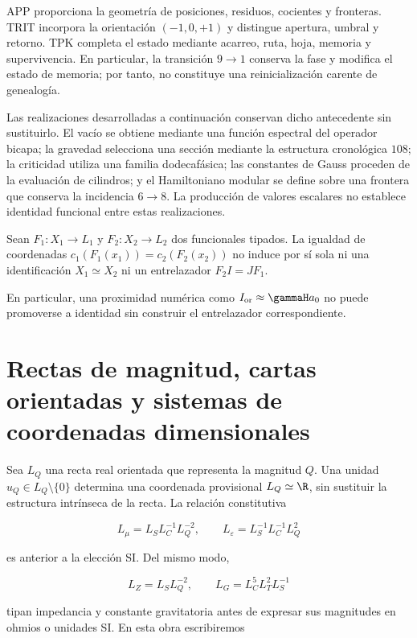 APP proporciona la geometr\'ia de posiciones, residuos, cocientes y
fronteras. TRIT incorpora la orientaci\'on \((-1,0,+1)\) y distingue
apertura, umbral y retorno. TPK completa el estado mediante acarreo, ruta,
hoja, memoria y supervivencia. En particular, la transici\'on \(9\to1\)
conserva la fase y modifica el estado de memoria; por tanto, no constituye
una reinicializaci\'on carente de genealog\'ia.

Las realizaciones desarrolladas a continuaci\'on conservan dicho antecedente sin sustituirlo. El vac\'io se obtiene mediante una funci\'on espectral del operador bicapa; la gravedad selecciona una secci\'on mediante la estructura cronol\'ogica \(108\); la criticidad utiliza una familia dodecaf\'asica; las constantes de Gauss proceden de la evaluaci\'on de cilindros; y el Hamiltoniano modular se define sobre una frontera que conserva la incidencia \(6\to8\). La producci\'on de valores escalares no establece identidad funcional entre estas realizaciones.

\begin{proposition}
Sean \(F_1:X_1\to L_1\) y \(F_2:X_2\to L_2\) dos funcionales tipados. La
igualdad de coordenadas \(c_1(F_1(x_1))=c_2(F_2(x_2))\) no induce por
s\'i sola ni una identificaci\'on \(X_1\simeq X_2\) ni un entrelazador
\(F_2I=JF_1\).
\end{proposition}

En particular, una proximidad num\'erica como
\(I_{\rm or}\approx\gammaH a_0\) no puede promoverse a identidad sin
construir el entrelazador correspondiente.

\section{Rectas de magnitud, cartas orientadas y sistemas de coordenadas dimensionales}

Sea \(L_Q\) una recta real orientada que representa la magnitud \(Q\).
Una unidad \(u_Q\in L_Q\setminus\{0\}\) determina una coordenada
provisional \(L_Q\simeq\R\), sin sustituir la estructura intr\'inseca de
la recta. La relaci\'on constitutiva

\[
L_\mu=L_S L_C^{-1}L_Q^{-2},\qquad
L_\varepsilon=L_S^{-1}L_C^{-1}L_Q^2
\]

es anterior a la elecci\'on SI. Del mismo modo,

\[
L_Z=L_SL_Q^{-2},\qquad L_G=L_C^5L_T^2L_S^{-1}
\]

tipan impedancia y constante gravitatoria antes de expresar sus magnitudes en
ohmios o unidades SI. En esta obra escribiremos

